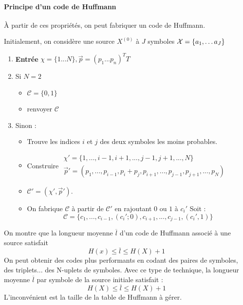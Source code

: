 \documentclass[main.tex]{subfiles}
\begin{document}
\paragraph{Principe d'un code de Huffmann}
À partir de ces propriétés, on peut fabriquer un code de Huffmann.

Initialement, on considère une source $X^{(0)}$ à $J$ symboles $\mathcal{X}=\{a_1,\dots a_J\}$

\begin{enumerate}
\item \textbf{Entrée} $\chi =\{1 ... N\} , \vec{p} = (p_1...p_n)^TT$
\item Si $N=2$
  \begin{itemize}
  \item $\mathcal{C}=\{0,1\}$
  \item renvoyer $\mathcal{C}$
  \end{itemize}
\item Sinon :
  \begin{itemize}
  \item Trouve les indices $i$ et $j$ des deux symboles les moins probables.
  \item Construire $
    \begin{array}{l}
      \chi'= \{1,...,i-1,i+1,...,j-1,j+1,...,N\}\\
      \vec{p}' = (p_1, ...,p_{i-1},p_i+p_j,p_{i+1},...,p_{j-1},p_{j+1},...,p_N)
    \end{array}$
    \item $\mathcal{C}' = (\chi',\vec{p}')$.
    \item On fabrique $\mathcal{C}$ à partir de $\mathcal{C}'$ en rajoutant $0$ ou $1$ à $c_i'$ Soit :
      \[
        \mathcal{C}=\{ c_1,...,c_{i-1},(c_i';0),c_{i+1},...,c_{j-1},(c_i',1)\}
      \]
  \end{itemize}
\end{enumerate}

\begin{prop}
  On montre que la longueur moyenne $\overline{l}$ d'un code de Huffmann associé à une source satisfait
  \[ H(x) \leq \overline{l} \leq H(X) +1 \]
  On peut obtenir des codes plus performants en codant des paires de symboles, des triplets... des N-uplets de symboles. Avec ce type de technique, la longueur moyenne $\overline{l}$ par symbole de la source initiale satisfait :
  \[H(X) \leq \overline{l} \leq H(X)+1 \]
  L'inconvénient est la taille de la table de Huffmann à gérer.
\end{prop}
\end{document}
